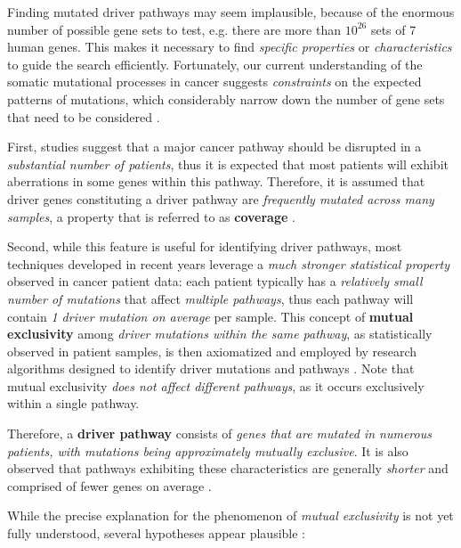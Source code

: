 Finding mutated driver pathways may seem implausible, because of the enormous number of possible gene sets to test, e.g. there are more than $10^{26}$ sets of 7 human genes. This makes it necessary to find \textit{specific properties} or \textit{characteristics} to guide the search efficiently. Fortunately, our current understanding of the somatic mutational processes in cancer suggests \textit{constraints} on the expected patterns of mutations, which considerably narrow down the number of gene sets that need to be considered \cite{dendrix}.

First, studies suggest that a major cancer pathway should be disrupted in a \textit{substantial number of patients}, thus it is expected that most patients will exhibit aberrations in some genes within this pathway. Therefore, it is assumed that driver genes constituting a driver pathway are \textit{frequently mutated across many samples}, a property that is referred to as \textbf{coverage} \cite{dendrix}.

Second, while this feature is useful for identifying driver pathways, most techniques developed in recent years leverage a \textit{much stronger statistical property} observed in cancer patient data: each patient typically has a \textit{relatively small number of mutations} that affect \textit{multiple pathways}, thus each pathway will contain \textit{1 driver mutation on average} per sample. This concept of \textbf{mutual exclusivity} among \textit{driver mutations within the same pathway}, as statistically observed in patient samples, is then axiomatized and employed by research algorithms designed to identify driver mutations and pathways \cite{multi-dendrix}. Note that mutual exclusivity \textit{does not affect different pathways}, as it occurs exclusively within a single pathway.

Therefore, a \textbf{driver pathway} consists of \textit{genes that are mutated in numerous patients, with mutations being approximately mutually exclusive}. It is also observed that pathways exhibiting these characteristics are generally \textit{shorter} and comprised of fewer genes on average \cite{multi-dendrix}.

While the precise explanation for the phenomenon of \textit{mutual exclusivity} is not yet fully understood, several hypotheses appear plausible \cite{survey, mutual_exclusivity_expls, dendrix}:

